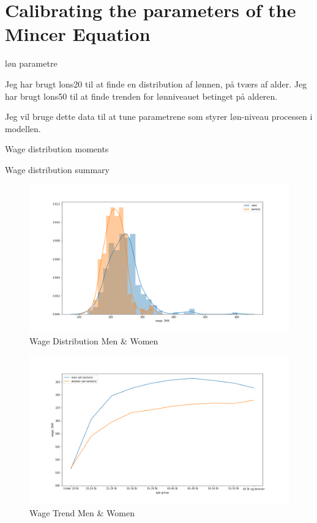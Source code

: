 \section{Calibrating the parameters of the Mincer Equation}

\iffalse

løn parametre

Jeg har brugt lons20 til at finde en distribution af lønnen, på tværs af alder.
Jeg har brugt lons50 til at finde trenden for lønniveauet betinget på alderen.

Jeg vil bruge dette data til at tune parametrene som styrer løn-niveau processen i modellen.

\begin{table}[ht]
    \centering
    
    \caption{Wage distribution moments}
    \label{tab:my_label}
\end{table}


\begin{table}[ht]
    \centering
    
    \caption{Wage distribution summary}
    \label{tab:my_label}
\end{table}

\begin{figure}
    \centering
    \includegraphics[scale=0.4]{figures/wage_distribution_lons20.png}
    \caption{Wage Distribution Men \& Women}
    \label{fig:my_label}
\end{figure}


\begin{figure}
    \centering
    \includegraphics[scale=0.4]{figures/wage_trend_lons50.png}
    \caption{Wage Trend Men \& Women}
    \label{fig:my_label}
\end{figure}

